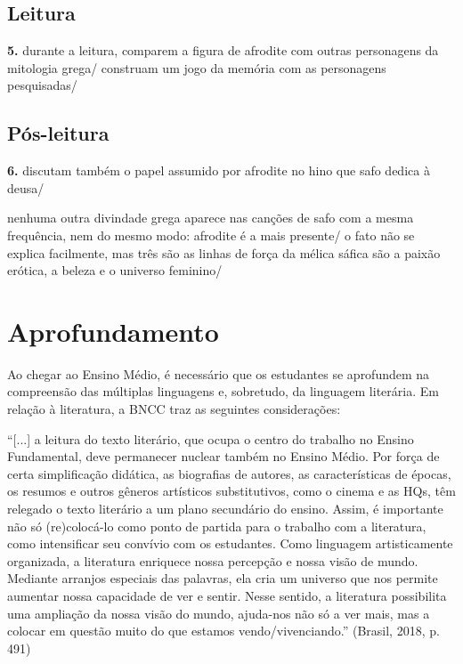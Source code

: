 \documentclass[12pt]{extarticle}
\begin{document}
\subsection{Leitura}



\textbf{5.} durante a leitura, comparem a figura de afrodite com outras
personagens da mitologia grega/ construam um jogo da memória com as
personagens pesquisadas/


\subsection{Pós-leitura}

\textbf{6.} discutam também o papel assumido por afrodite no hino que
safo dedica à deusa/


nenhuma outra divindade grega aparece nas canções de safo com a mesma
frequência, nem do mesmo modo: afrodite é a mais presente/ o fato não se
explica facilmente, mas três são as linhas de força da mélica sáfica
são a paixão erótica, a beleza e o universo feminino/

\section{Aprofundamento}


Ao chegar ao Ensino Médio, é necessário que os estudantes se aprofundem
na compreensão das múltiplas linguagens e, sobretudo, da linguagem
literária. Em relação à literatura, a BNCC traz as seguintes
considerações:

``{[}...{]} a leitura do texto literário, que ocupa o centro do trabalho
no Ensino Fundamental, deve permanecer nuclear também no Ensino Médio.
Por força de certa simplificação didática, as biografias de autores, as
características de épocas, os resumos e outros gêneros artísticos
substitutivos, como o cinema e as HQs, têm relegado o texto literário a
um plano secundário do ensino. Assim, é importante não só (re)colocá-lo
como ponto de partida para o trabalho com a literatura, como
intensificar seu convívio com os estudantes. Como linguagem
artisticamente organizada, a literatura enriquece nossa percepção e
nossa visão de mundo. Mediante arranjos especiais das palavras, ela cria
um universo que nos permite aumentar nossa capacidade de ver e sentir.
Nesse sentido, a literatura possibilita uma ampliação da nossa visão do
mundo, ajuda-nos não só a ver mais, mas a colocar em questão muito do
que estamos vendo/vivenciando.'' (Brasil, 2018, p. 491)
\end{document}
